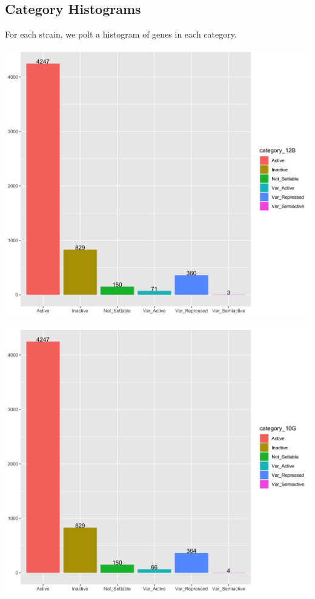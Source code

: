 \documentclass[11pt]{article}
\begin{document}
\subsection{Category Histograms}
\label{sec:orgb16083a}
For each strain, we polt a histogram of genes in each category.

\begin{center}
\includegraphics[width=.9\linewidth]{./Plots/histogram_12B.png}
\end{center}

\begin{center}
\includegraphics[width=.9\linewidth]{./Plots/histogram_10G.png}
\end{center}
\end{document}

